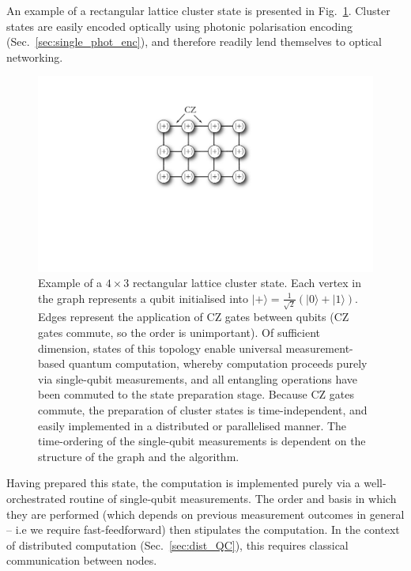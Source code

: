 \documentclass[aps, rmp, twocolumn, amsmath, amssymb, nofootinbib, superscriptaddress, longbibliography, floatfix, table-of-contents, eqsecnum]{revtex4-1}
\newcommand{\ket}[1]{|#1\rangle}
\begin{document}
An example of a rectangular lattice cluster state is presented in Fig.~\ref{fig:cluster_state}. Cluster states are easily encoded optically using photonic polarisation encoding (Sec.~\ref{sec:single_phot_enc}), and therefore readily lend themselves to optical networking.

\begin{figure}[!htb]
	\includegraphics[width=0.6\columnwidth]{cluster_state}
	\caption{Example of a \mbox{$4\times 3$} rectangular lattice cluster state. Each vertex in the graph represents a qubit initialised into \mbox{$\ket{+}=\frac{1}{\sqrt{2}}(\ket{0}+\ket{1})$}. Edges represent the application of CZ gates between qubits (CZ gates commute, so the order is unimportant). Of sufficient dimension, states of this topology enable universal measurement-based quantum computation, whereby computation proceeds purely via single-qubit measurements, and all entangling operations have been commuted to the state preparation stage. Because CZ gates commute, the preparation of cluster states is time-independent, and easily implemented in a distributed or parallelised manner. The time-ordering of the single-qubit measurements is dependent on the structure of the graph and the algorithm.} \label{fig:cluster_state}
\end{figure}

Having prepared this state, the computation is implemented purely via a well-orchestrated routine of single-qubit measurements. The order and basis in which they are performed (which depends on previous measurement outcomes in general -- i.e we require fast-feedforward) then stipulates the computation. In the context of distributed computation (Sec.~\ref{sec:dist_QC}), this requires classical communication between nodes.
\end{document}
